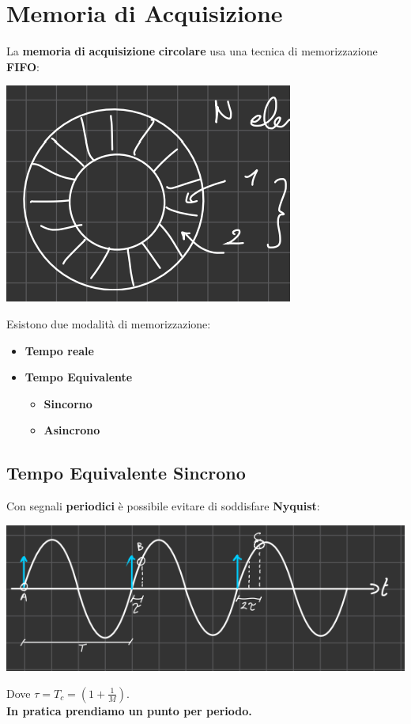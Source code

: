 \section{Memoria di Acquisizione}
La \textbf{memoria} \textbf{di} \textbf{acquisizione} \textbf{circolare} usa una tecnica di memorizzazione \textbf{FIFO}:
\begin{center}
    \includegraphics[width=.5\textwidth]{Images/figure19.png}
\end{center}
Esistono due modalità di memorizzazione:
\begin{itemize}
    \item \textbf{Tempo reale }
    \item \textbf{Tempo Equivalente}
    \begin{itemize}
        \item \textbf{Sincorno}
        \item \textbf{Asincrono}
    \end{itemize}
\end{itemize}
\subsection{Tempo Equivalente Sincrono}
Con segnali \textbf{periodici} è possibile evitare di soddisfare \textbf{Nyquist}:
\begin{center}
    \includegraphics[width=.6\textwidth]{Images/figure20.png}
\end{center}
Dove $\tau = T_c = \left(1 + \frac{1}{M}\right)$.\\
\textbf{In pratica prendiamo un punto per periodo.}
